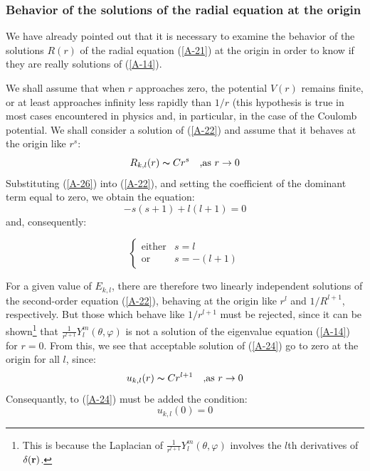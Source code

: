 \subsubsection{Behavior of the solutions of the radial equation at the origin}
We have already pointed out that it is necessary to examine the behavior of the solutions $R(r)$ of the radial equation (\ref{A-21}) at the origin in order to know if they are really solutions of (\ref{A-14}).

We shall assume that when $r$ approaches zero, the potential $V(r)$ remains finite, or at least approaches infinity less rapidly than $1/r$ (this hypothesis is true in most cases encountered in physics and, in particular, in the case of the Coulomb potential. We shall consider a solution of (\ref{A-22}) and assume that it behaves at the origin like $r^s$:
\begin{equation}\label{A-26}
	R_{k,l}(r)\thicksim Cr^s\quad \mbox{,as } r\to 0
\end{equation}
Substituting (\ref{A-26}) into (\ref{A-22}), and setting the coefficient of the dominant term equal to zero, we obtain the equation:
\begin{equation}
	-s(s+1) + l(l+1)=0
\end{equation}
and, consequently:

\begin{equation}\label{A-28}
	\left \{
		\begin{array}{ccc}
			\mbox{either} & s=l\\
			\mbox{or}  & s=-(l+1)
		\end{array}
	\right.
\end{equation}

For a given value of $E_{k,l}$, there are therefore two linearly independent solutions of the second-order equation (\ref{A-22}), behaving at the origin like $r^l$ and $1/R^{l+1}$, respectively. But those which behave like $1/r^{l+1}$ must be rejected, since it can be shown\footnote{This is because the Laplacian of $\frac{1}{r^{l+1}}Y_l^m(\theta,\varphi)$ involves the $l$th derivatives of $\delta(\vb{r})$.} that $\frac{1}{r^{l+1}}Y_l^m(\theta,\varphi)$ is not a solution of the eigenvalue equation (\ref{A-14}) for $r=0$. From this, we see that acceptable solution of (\ref{A-24}) go to zero at the origin for all $l$, since:
\begin{equation}\label{A-29}
	u_{k,l}(r)\thicksim Cr^{l+1}\quad  \mbox{,as } r\to 0
\end{equation}
Consequantly, to (\ref{A-24}) must be added the condition:
\begin{equation}\label{A-30}
	\boxed{u_{k,l}(0)=0}
\end{equation}

